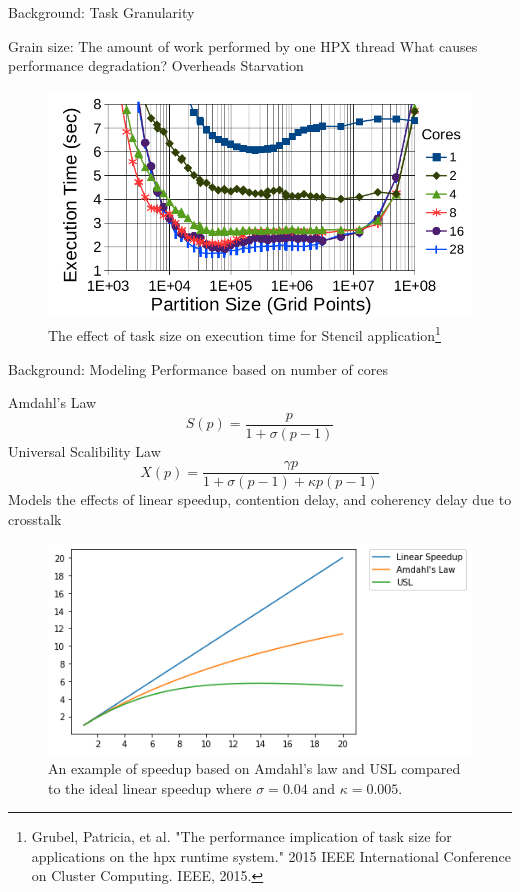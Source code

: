\documentclass[10pt]{beamer}
\begin{document}
\begin{frame}{Background: Task Granularity}
	\begin{outline}
		Grain size: The amount of work performed by one HPX thread
		\1What causes performance degradation?
		\2Overheads
		\2Starvation
		\begin{figure}
			\centering
			\includegraphics[width=0.72\linewidth]{images/task_granularity.png}
			\caption{The effect of task size on execution time for Stencil application\footnote{Grubel, Patricia, et al. "The performance implication of task size for applications on the hpx runtime system." 2015 IEEE International Conference on Cluster Computing. IEEE, 2015.}}	
	
		\end{figure}
		
	\end{outline}
\end{frame}


\begin{frame}{Background: Modeling Performance based on number of cores}
	\begin{outline}
		\1Amdahl's Law
			$$S(p) = \frac{p}{1+\sigma(p-1)}$$
		\1Universal Scalibility Law
		$$X(p) = \frac{\gamma{p}}{1+\sigma(p-1)+\kappa{p}(p-1)}$$
		\2 Models the effects
		of linear speedup, contention delay, and coherency delay due to crosstalk
		\begin{figure}[H]
			\centering
			\includegraphics[scale=0.38]{images/amdahls.png}
			\caption{An example of speedup based on Amdahl's law and USL compared to the ideal linear speedup where $\sigma=0.04$ and $\kappa=0.005$.}	
			\label{fig_Amdahl}
		\end{figure}
		

	\end{outline}
\end{frame}
\end{document}
